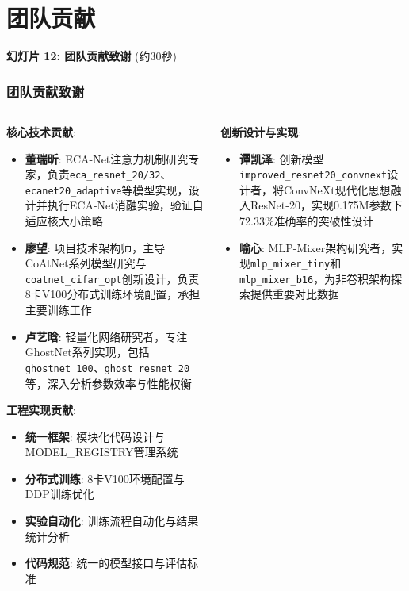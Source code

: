 \documentclass[10pt]{beamer}
\begin{document}
\section{团队贡献}
\begin{frame}{\textbf{幻灯片 12: 团队贡献致谢} (约30秒)}
\frametitle{团队贡献致谢}

{\scriptsize
\begin{columns}[T]
    \begin{column}{0.48\textwidth}
        \textbf{核心技术贡献}:
        \begin{itemize}
            \item \textbf{董瑞昕}: ECA-Net注意力机制研究专家，负责\texttt{eca\_resnet\_20/32}、\texttt{ecanet20\_adaptive}等模型实现，设计并执行ECA-Net消融实验，验证自适应核大小策略
            \item \textbf{廖望}: 项目技术架构师，主导CoAtNet系列模型研究与\texttt{coatnet\_cifar\_opt}创新设计，负责8卡V100分布式训练环境配置，承担主要训练工作
            \item \textbf{卢艺晗}: 轻量化网络研究者，专注GhostNet系列实现，包括\texttt{ghostnet\_100}、\texttt{ghost\_resnet\_20}等，深入分析参数效率与性能权衡
        \end{itemize}
        
        \textbf{工程实现贡献}:
        \begin{itemize}
            \item \textbf{统一框架}: 模块化代码设计与MODEL\_REGISTRY管理系统
            \item \textbf{分布式训练}: 8卡V100环境配置与DDP训练优化
            \item \textbf{实验自动化}: 训练流程自动化与结果统计分析
            \item \textbf{代码规范}: 统一的模型接口与评估标准
        \end{itemize}
    \end{column}
    \begin{column}{0.48\textwidth}
        \textbf{创新设计与实现}:
        \begin{itemize}
            \item \textbf{谭凯泽}: 创新模型\texttt{improved\_resnet20\_convnext}设计者，将ConvNeXt现代化思想融入ResNet-20，实现0.175M参数下72.33\%准确率的突破性设计
            \item \textbf{喻心}: MLP-Mixer架构研究者，实现\texttt{mlp\_mixer\_tiny}和\texttt{mlp\_mixer\_b16}，为非卷积架构探索提供重要对比数据
        \end{itemize}
        

\end{column}
\end{columns}}
\end{frame}
\end{document}
